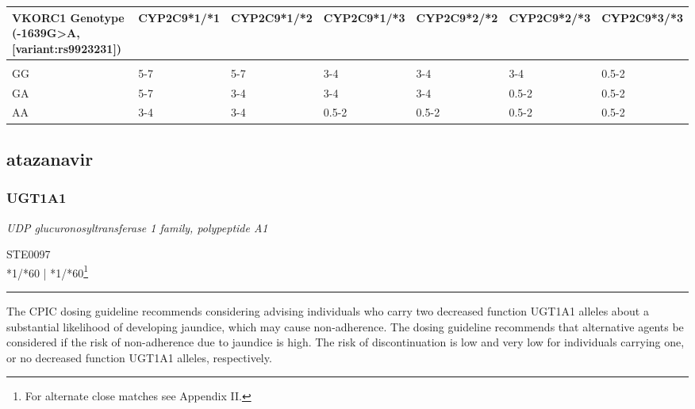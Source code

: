 \documentclass{report}
\begin{document}
      \begin{tabularx}{\textwidth}{ XXXXXXX }
      \textbf{ VKORC1 Genotype (-1639G>A, [variant:rs9923231]) }&\textbf{ CYP2C9*1/*1 }&\textbf{ CYP2C9*1/*2 }&\textbf{ CYP2C9*1/*3 }&\textbf{ CYP2C9*2/*2 }&\textbf{ CYP2C9*2/*3 }&\textbf{ CYP2C9*3/*3} \\ \hline \\  GG & 5-7 & 5-7 & 3-4 & 3-4 & 3-4 & 0.5-2 \\  GA & 5-7 & 3-4 & 3-4 & 3-4 & 0.5-2 & 0.5-2 \\  AA & 3-4  & 3-4 & 0.5-2 & 0.5-2 & 0.5-2 & 0.5-2 \\ 
      \end{tabularx}
      
      \normalsize











\subsection{ atazanavir }

\subsubsection{ UGT1A1 }
     \textit{ UDP glucuronosyltransferase 1 family, polypeptide A1 } \begin{flushright} \textsc{ STE0097 \\ *1/*60  | *1/*60\footnote{For alternate close matches see Appendix II.} }\end{flushright}
      \hrule \vspace{6pt}
      The CPIC dosing guideline recommends considering advising individuals who carry two decreased function UGT1A1 alleles about a substantial likelihood of developing jaundice, which may cause non-adherence. The dosing guideline recommends that alternative agents be considered if the risk of non-adherence due to jaundice is high. The risk of discontinuation is low and very low for individuals carrying one, or no decreased function UGT1A1 alleles, respectively. \newline
      \scriptsize
      
\end{document}
